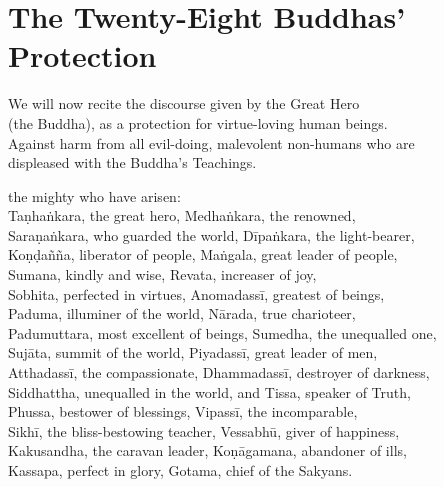 
\cleartoverso


\chapterTocDelegatePageNumber
\chapter{The Twenty-Eight Buddhas' Protection}%

\setTocDelegatedPageNumber

\vspace*{5pt}

{\setlength{\parskip}{0pt}%

\begin{soloonechants}
We will now recite the discourse given by the Great Hero\\
(the Buddha), as a protection for virtue-loving human beings.\\
Against harm from all evil-doing, malevolent non-humans who are\\
displeased with the Buddha's Teachings.\\
\end{soloonechants}%
}

\vspace*{-2pt}

\englishText

\begin{onechants}
 the mighty who have arisen:\\
Taṇhaṅkara, the great hero, Medhaṅkara, the renowned,\\
Saraṇaṅkara, who guarded the world, Dīpaṅkara, the light-bearer,\\
Koṇḍañña, liberator of people, Maṅgala, great leader of people,\\
Sumana, kindly and wise, Revata, increaser of joy,\\
Sobhita, perfected in virtues, Anomadassī, greatest of beings,\\
Paduma, illuminer of the world, Nārada, true charioteer,\\
Padumuttara, most excellent of beings, Sumedha, the unequalled one,\\
Sujāta, summit of the world,  Piyadassī, great leader of men,\\
Atthadassī, the compassionate, Dhammadassī, destroyer of darkness,\\
Siddhattha, unequalled in the world,  and Tissa, speaker of Truth,\\
Phussa, bestower of blessings, Vipassī, the incomparable,\\
Sikhī, the bliss-bestowing teacher, Vessabhū, giver of happiness,\\
Kakusandha, the caravan leader, Koṇāgamana, abandoner of ills,\\
Kassapa, perfect in glory, Gotama, chief of the Sakyans.\\
\end{onechants}

